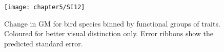 \begin{figure}[htb]
\centering
\texttt{[image: chapter5/SI12]}
\caption{Change in GM for bird species binned by functional groups of traits. Coloured for better visual distinction only. Error ribbons show the predicted standard error.}
\label{SI05_12}
\end{figure}